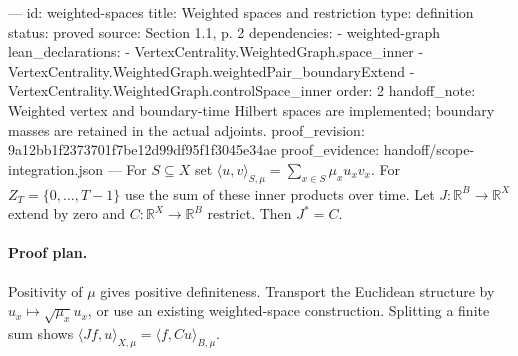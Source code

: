 ---
id: weighted-spaces
title: Weighted spaces and restriction
type: definition
status: proved
source: Section 1.1, p. 2
dependencies:
- weighted-graph
lean_declarations:
- VertexCentrality.WeightedGraph.space_inner
- VertexCentrality.WeightedGraph.weightedPair_boundaryExtend
- VertexCentrality.WeightedGraph.controlSpace_inner
order: 2
handoff_note: Weighted vertex and boundary-time Hilbert spaces are implemented; boundary masses are retained in the actual adjoints.
proof_revision: 9a12bb1f2373701f7be12d99df95f1f3045e34ae
proof_evidence: handoff/scope-integration.json
---
For $S\subseteq X$ set $\langle u,v\rangle_{S,\mu}=\sum_{x\in S}\mu_xu_xv_x$. For $Z_T=\{0,\ldots,T-1\}$ use the sum of these inner products over time. Let $J:\mathbb R^B\to\mathbb R^X$ extend by zero and $C:\mathbb R^X\to\mathbb R^B$ restrict. Then $J^*=C$.

\paragraph{Proof plan.}
Positivity of $\mu$ gives positive definiteness. Transport the Euclidean structure by $u_x\mapsto\sqrt{\mu_x}u_x$, or use an existing weighted-space construction. Splitting a finite sum shows $\langle Jf,u\rangle_{X,\mu}=\langle f,Cu\rangle_{B,\mu}$.
